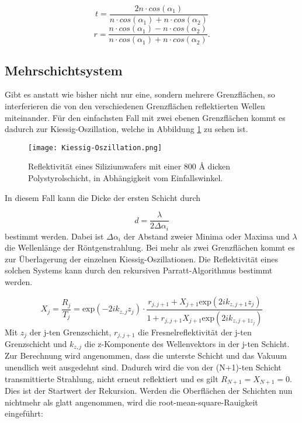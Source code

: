 \begin{equation}
    t = \frac{2 n \cdot cos(\alpha_1)}{n \cdot cos(\alpha_1) + n \cdot cos(\alpha_2)}
\end{equation}
\begin{equation}
    r = \frac{n \cdot cos(\alpha_1) - n \cdot cos(\alpha_2)}{n \cdot cos(\alpha_1) + n \cdot cos(\alpha_2)}.
\end{equation}


\subsection{Mehrschichtsystem}
Gibt es anstatt wie bisher nicht nur eine, sondern mehrere Grenzflächen, so interferieren die von den verschiedenen Grenzflächen reflektierten Wellen miteinander.
Für den einfachsten Fall mit zwei ebenen Grenzflächen kommt es dadurch zur Kiessig-Oszillation, welche in Abbildung \ref{fig:Kiessig-Oszillation} zu sehen ist.

\begin{figure}
    \centering
    \texttt{[image: Kiessig-Oszillation.png]}
    \caption{Reflektivität eines Siliziumwafers mit einer 800 Å dicken Polystyrolschicht, in Abhängigkeit vom Einfallswinkel. \cite{Anleitungalt}}
    \label{fig:Kiessig-Oszillation}
\end{figure}

In diesem Fall kann die Dicke der ersten Schicht durch 

\begin{equation}
    \label{eqn:dicke}
    d = \frac{\lambda}{2 \Delta \alpha_i}
\end{equation}
bestimmt werden. Dabei ist $\Delta \alpha_i$ der Abstand zweier Minima oder Maxima und $\lambda$ die Wellenlänge der Röntgenstrahlung.
Bei mehr als zwei Grenzflächen kommt es zur Überlagerung der einzelnen Kiessig-Oszillationen. 
Die Reflektivität eines solchen Systems kann durch den rekursiven Parratt-Algorithmus bestimmt werden.

\begin{equation}
    X_j = \frac{R_j}{T_j} = \text{exp}(-2i k_{z,j} z_j) \cdot \frac{r_{j,j+1} + X_{j+1} \text{exp}(2i k_{z,j+1} z_j) }{1 + r_{j,j+1} X_{j+1} \text{exp}(2i k_{z,j+1 z_j})}
\end{equation}
Mit $z_j$ der j-ten Grenzschicht, $r_{j,j+1}$ die Fresnelreflektivität der j-ten Grenzschicht und $k_{z,j}$ die z-Komponente des Wellenvektors in der j-ten Schicht.
Zur Berechnung wird angenommen, dass die unterste Schicht und das Vakuum unendlich weit ausgedehnt sind. Dadurch wird die von der (N+1)-ten Schicht transmittierte 
Strahlung, nicht erneut reflektiert und es gilt $R_{N+1} = X_{N+1} = 0$.
Dies ist der Startwert der Rekursion.
Werden die Oberflächen der Schichten nun nichtmehr als glatt angenommen, wird die \glqq root-mean-square\grqq{}-Rauigkeit eingeführt:

